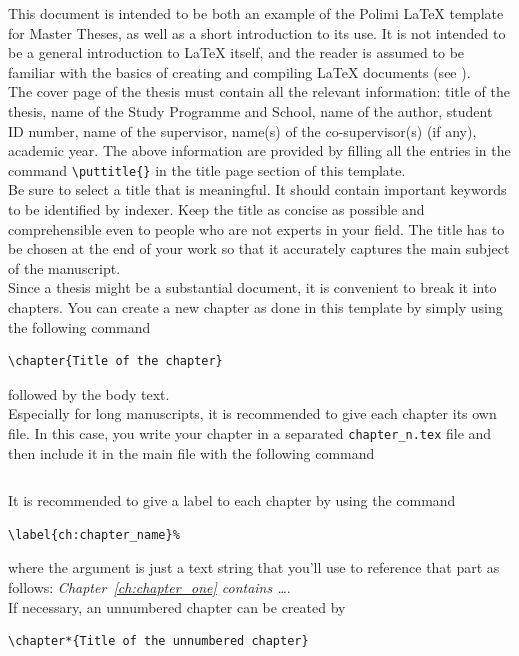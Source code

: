\documentclass{Configuration_Files/PoliMi3i_thesis}
\begin{document}
This document is intended to be both an example of the Polimi \LaTeX{} template for Master Theses,
as well as a short introduction to its use. It is not intended to be a general introduction to \LaTeX{} itself,
and the reader is assumed to be familiar with the basics of creating and compiling \LaTeX{} documents (see \cite{oetiker1995not, kottwitz2015latex}). 
\\
The cover page of the thesis must contain all the relevant information:
title of the thesis, name of the Study Programme and School, name of the author,
student ID number, name of the supervisor, name(s) of the co-supervisor(s) (if any), academic year.
The above information are provided by filling all the entries in the command \verb|\puttitle{}|
in the title page section of this template.
\\
Be sure to select a title that is meaningful.
It should contain important keywords to be identified by indexer.
Keep the title as concise as possible and comprehensible even to people who are not experts in your field.
The title has to be chosen at the end of your work so that it accurately captures the main subject of the manuscript. 
\\
Since a thesis might be a substantial document, it is convenient to break it into chapters.
You can create a new chapter as done in this template by simply using the following command
\begin{verbatim}
\chapter{Title of the chapter}
\end{verbatim}
followed by the body text.
\\
Especially for long manuscripts, it is recommended to give each chapter its own file.
In this case, you write your chapter in a separated \verb|chapter_n.tex| file
and then include it in the main file with the following command
\begin{verbatim}

\end{verbatim}
It is recommended to give a label to each chapter by using the command
\begin{verbatim}
\label{ch:chapter_name}%
\end{verbatim}
where the argument is just a text string that you'll use to reference that part
as follows: \textit{Chapter~\ref{ch:chapter_one} contains   \dots}.\\
If necessary, an unnumbered chapter can be created by
\begin{verbatim}
\chapter*{Title of the unnumbered chapter}
\end{verbatim}
\end{document}
